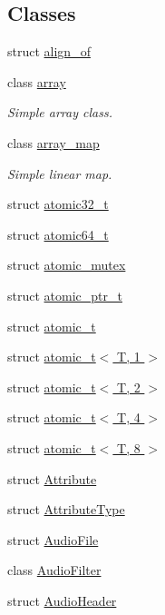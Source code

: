 \subsection*{Classes}
\begin{DoxyCompactItemize}
\item 
struct \hyperlink{structcrap_1_1align__of}{align\+\_\+of}
\item 
class \hyperlink{classcrap_1_1array}{array}
\begin{DoxyCompactList}\small\item\em Simple array class. \end{DoxyCompactList}\item 
class \hyperlink{classcrap_1_1array__map}{array\+\_\+map}
\begin{DoxyCompactList}\small\item\em Simple linear map. \end{DoxyCompactList}\item 
struct \hyperlink{structcrap_1_1atomic32__t}{atomic32\+\_\+t}
\item 
struct \hyperlink{structcrap_1_1atomic64__t}{atomic64\+\_\+t}
\item 
struct \hyperlink{structcrap_1_1atomic__mutex}{atomic\+\_\+mutex}
\item 
struct \hyperlink{structcrap_1_1atomic__ptr__t}{atomic\+\_\+ptr\+\_\+t}
\item 
struct \hyperlink{structcrap_1_1atomic__t}{atomic\+\_\+t}
\item 
struct \hyperlink{structcrap_1_1atomic__t_3_01_t_00_011_01_4}{atomic\+\_\+t$<$ T, 1 $>$}
\item 
struct \hyperlink{structcrap_1_1atomic__t_3_01_t_00_012_01_4}{atomic\+\_\+t$<$ T, 2 $>$}
\item 
struct \hyperlink{structcrap_1_1atomic__t_3_01_t_00_014_01_4}{atomic\+\_\+t$<$ T, 4 $>$}
\item 
struct \hyperlink{structcrap_1_1atomic__t_3_01_t_00_018_01_4}{atomic\+\_\+t$<$ T, 8 $>$}
\item 
struct \hyperlink{structcrap_1_1_attribute}{Attribute}
\item 
struct \hyperlink{structcrap_1_1_attribute_type}{Attribute\+Type}
\item 
struct \hyperlink{structcrap_1_1_audio_file}{Audio\+File}
\item 
class \hyperlink{classcrap_1_1_audio_filter}{Audio\+Filter}
\item 
struct \hyperlink{structcrap_1_1_audio_header}{Audio\+Header}
\item 

\end{DoxyCompactItemize}
